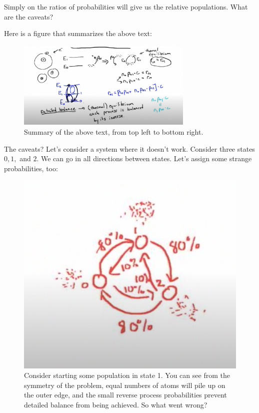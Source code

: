 \documentclass{article}
\begin{document}
Simply on the ratios of probabilities will give us the relative populations. What are the caveats?


Here is a figure that summarizes the above text: 
\begin{figure}
    \centering
    \includegraphics[width=0.75\textwidth]{figures/Screen Shot 2020-10-10 at 7.22.32 PM.png}
    \caption{Summary of the above text, from top left to bottom right. }
    \label{fig:summmmm}
\end{figure}


The caveats? Let's consider a system where it doesn't work. Consider three states $0,1,$ and $2$. We can go in all directions between states. Let's assign some strange probabilities, too:

\begin{figure}
    \centering
    \includegraphics{figures/Screen Shot 2020-10-10 at 7.25.44 PM.png}
    \caption{Consider starting some population in state 1. You can see from the symmetry of the problem, equal numbers of atoms will pile up on the outer edge, and the small reverse process probabilities prevent detailed balance from being achieved. So what went wrong? }
    \label{fig:detbalancefailure}
\end{figure}
\end{document}
